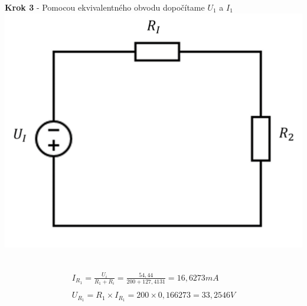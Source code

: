 \begin{center}
    \textbf{Krok 3} - Pomocou ekvivalentného obvodu dopočítame $U_1$ a $I_1$
\includegraphics[scale=0.5,keepaspectratio]{fig/pr2_3.png} \
\end{center}

\begin{gather*}
    I_{R_{1}} = \frac {U_{i}} {R_{1} + R_{i}} = \frac {54,44} { 200 + 127,4131} = 16,6273 mA \\\\
    U_{R_{1}} = R_1 \times  I_{R_{1}} = 200 \times 0,166273 = 33,2546 V \\
\end{gather*}

